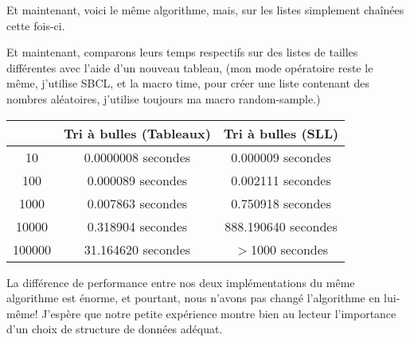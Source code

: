 \documentclass[a4paper, 12pt]{article}
\numberwithin{equation}{subsection}
\begin{document}
Et maintenant, voici le même algorithme, mais, sur les listes simplement chaînées cette fois-ci.

Et maintenant, comparons leurs temps respectifs sur des listes de tailles différentes avec l'aide d'un nouveau tableau, (mon mode opératoire reste le même, j'utilise SBCL, et la macro time, pour créer une liste contenant des nombres aléatoires, j'utilise toujours ma macro random-sample.)
\begin{table}[H]
  \begin{tabular}{|c|c|c|}
    \hline & Tri à bulles (Tableaux) & Tri à bulles (SLL) \\
    \hline 10 &  0.0000008 secondes &  0.000009 secondes \\
    \hline 100 &  0.000089 secondes &  0.002111 secondes \\
    \hline 1000 & 0.007863 secondes &  0.750918 secondes \\
    \hline 10000 & 0.318904 secondes & 888.190640 secondes \\
    \hline 100000 &  31.164620 secondes & $>$1000 secondes \\
    \hline
  \end{tabular}
\end{table}
La différence de performance entre nos deux implémentations du même algorithme est énorme, et pourtant, nous n'avons pas changé l'algorithme en lui-même! J'espère que notre petite expérience montre bien au lecteur l'importance d'un choix de structure de données adéquat.
\end{document}
